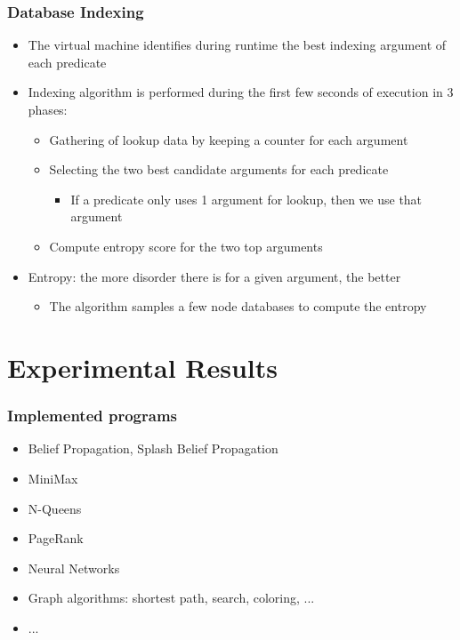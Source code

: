 \documentclass{beamer}
\begin{document}
\begin{frame}[fragile]
   \frametitle{Database Indexing}
   \begin{itemize}
      \item The virtual machine identifies during runtime the best indexing argument of each predicate
      \item Indexing algorithm is performed during the first few seconds of execution in 3 phases:
      \begin{itemize}
         \item Gathering of lookup data by keeping a counter for each argument
         \item Selecting the two best candidate arguments for each predicate
         \begin{itemize}
            \item If a predicate only uses 1 argument for lookup, then we use that argument
         \end{itemize}
         \item Compute entropy score for the two top arguments
      \end{itemize}
      \item Entropy: the more disorder there is for a given argument, the better
      \begin{itemize}
         \item The algorithm samples a few node databases to compute the entropy
      \end{itemize}
   \end{itemize}
\end{frame}

\section{Experimental Results}

\begin{frame}[fragile]
   \frametitle{Implemented programs}
   \begin{itemize}
      \item Belief Propagation, Splash Belief Propagation
      \item MiniMax
      \item N-Queens
      \item PageRank
      \item Neural Networks
      \item Graph algorithms: shortest path, search, coloring, ...
      \item ...
   \end{itemize}
\end{frame}
\end{document}
